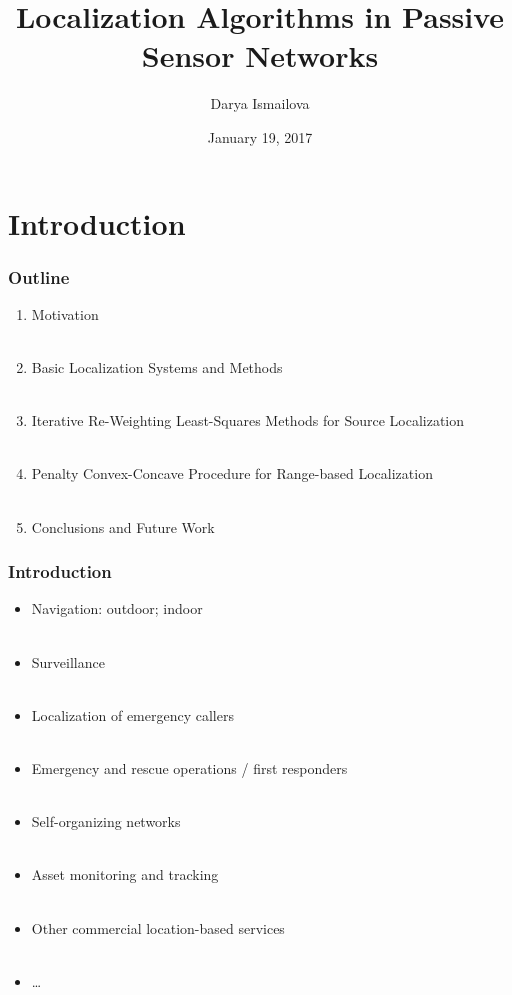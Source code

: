 \documentclass [t] {beamer} %
\title[Localization in PSN]{Localization Algorithms in Passive Sensor Networks}
\author{Darya Ismailova}
\institute[UVic] 
{
Department of Electrical and Computer Engineering \\
University of Victoria, Victoria, BC, Canada \\
\medskip
}
\date{January 19, 2017}
\begin{document}
 

\begin{frame} %
\titlepage 
\end{frame}




\section{Introduction} 

\begin{frame} %
\frametitle{Outline} 
\begin{enumerate}
\item
Motivation
\\~\\
\item
Basic Localization Systems and Methods
\\~\\
\item
Iterative Re-Weighting Least-Squares Methods for Source Localization
\\~\\
\item
Penalty Convex-Concave Procedure for Range-based Localization
\\~\\
\item
Conclusions and Future Work
\end{enumerate}
\end{frame}


\begin{frame} %
\frametitle{Introduction}
\phantom{m}
\begin{itemize}
\item
Navigation: outdoor; indoor
\\~\\
\item
Surveillance
\\~\\
\item
Localization of emergency callers
\\~\\
\item
Emergency and rescue operations / first responders
\\~\\
\item
Self-organizing networks
\\~\\
\item
Asset monitoring and tracking
\\~\\
\item
Other commercial location-based services
\\~\\
\item
\ldots
\end{itemize}
\end{frame}
\end{document}
